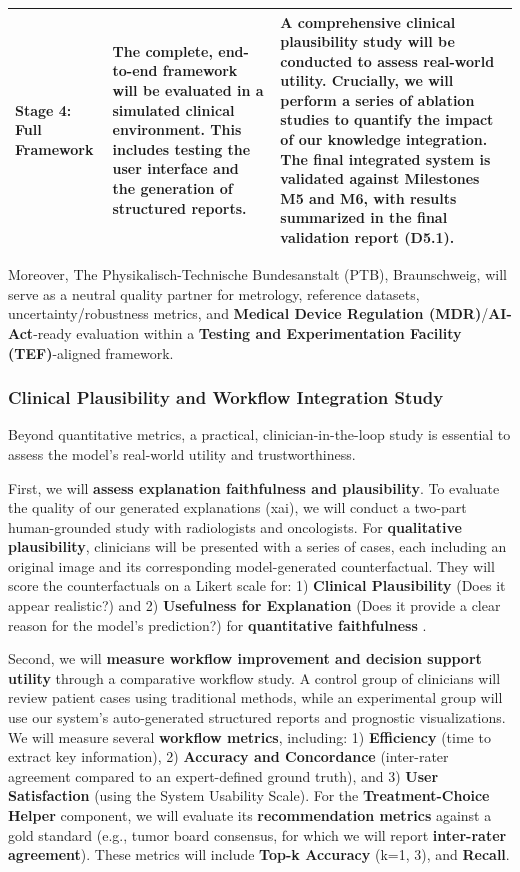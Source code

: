 \documentclass[11pt, a4paper]{article}
\begin{document}
\begin{table}[H]
\begin{tabular}{p{} p{} p{}}
        \addlinespace
        \textbf{Stage 4: Full Framework} & The complete, end-to-end framework will be evaluated in a simulated clinical environment. This includes testing the user interface and the generation of structured reports. & A comprehensive clinical plausibility study will be conducted to assess real-world utility. Crucially, we will perform a series of \textbf{ablation studies} to quantify the impact of our knowledge integration. The final integrated system is validated against \textbf{Milestones M5 and M6}, with results summarized in the final validation report (\textbf{D5.1}). \\
        \bottomrule
    \end{tabular}
\end{table}

Moreover, The Physikalisch-Technische Bundesanstalt (PTB), Braunschweig, will serve as a neutral quality partner for metrology, reference datasets, uncertainty/robustness metrics, and \textbf{Medical Device Regulation (MDR)}/\textbf{AI-Act}-ready evaluation within a \textbf{Testing and Experimentation Facility (TEF)}-aligned framework.

\subsubsection{Clinical Plausibility and Workflow Integration Study}
Beyond quantitative metrics, a practical, clinician-in-the-loop study is essential to assess the model's real-world utility and trustworthiness.

First, we will \textbf{assess explanation faithfulness and plausibility}. To evaluate the quality of our generated explanations (\gls{xai}), we will conduct a two-part human-grounded study with radiologists and oncologists. For \textbf{qualitative plausibility}, clinicians will be presented with a series of cases, each including an original image and its corresponding model-generated counterfactual. They will score the counterfactuals on a Likert scale for: 1) \textbf{Clinical Plausibility} (Does it appear realistic?) and 2) \textbf{Usefulness for Explanation} (Does it provide a clear reason for the model's prediction?) for \textbf{quantitative faithfulness} .

Second, we will \textbf{measure workflow improvement and decision support utility} through a comparative workflow study. A control group of clinicians will review patient cases using traditional methods, while an experimental group will use our system's auto-generated structured reports and prognostic visualizations. We will measure several \textbf{workflow metrics}, including: 1) \textbf{Efficiency} (time to extract key information), 2) \textbf{Accuracy and Concordance} (inter-rater agreement compared to an expert-defined ground truth), and 3) \textbf{User Satisfaction} (using the System Usability Scale). For the \textbf{Treatment-Choice Helper} component, we will evaluate its \textbf{recommendation metrics} against a gold standard (e.g., tumor board consensus, for which we will report \textbf{inter-rater agreement}). These metrics will include \textbf{Top-k Accuracy} (k=1, 3), and \textbf{Recall}. 
\end{document}
